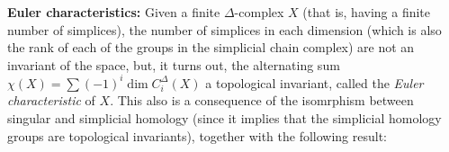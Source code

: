 \def\ccy{\Cyan}		  %
\def\cpb{\ProcessBlue}	  %
\def\csb{\SkyBlue}	  %
\def\ctu{\Turquoise}	  %
\def\ctb{\TealBlue}	  %
\def\caq{\Aquamarine}	  %
\def\cbg{\BlueGreen}	  %
\def\cem{\Emerald}	  %
\def\csg{\SeaGreen}	  %
\def\cgg{\Green}	  %
\def\cfg{\ForestGreen}	  %
\def\cpg{\PineGreen}	  %
\def\clg{\LimeGreen}	  %
\def\cyg{\YellowGreen}	  %
\def\cspg{\SpringGreen}	  %
\def\cog{\OliveGreen}	  %
\def\pars{\RawSienna}	  %
\def\cse{\Sepia}		  %
\def\cbr{\Brown}		  %
\def\cta{\Tan}		  %
\def\cgr{\Gray}		  %
\def\cbl{\Black}		  %
\def\cwh{\White}		  %


\loadmsbm



\def\ctln{\centerline}
\def\u{\underbar}
\def\ssk{\smallskip}
\def\msk{\medskip}
\def\bsk{\bigskip}
\def\hsk{\hskip.1in}
\def\hhsk{\hskip.2in}
\def\dsl{\displaystyle}
\def\hskp{\hskip1.5in}

\def\lra{$\Leftrightarrow$ }
\def\ra{\rightarrow}
\def\mpto{\logmapsto}
\def\pu{\pi_1}
\def\mpu{$\pi_1$}
\def\sig{\Sigma}
\def\msig{$\Sigma$}
\def\ep{\epsilon}
\def\sset{\subseteq}
\def\del{\partial}
\def\inv{^{-1}}
\def\wtl{\widetilde}
\def\del{\partial}
\def\delp{\partial^\prime}
\def\delpp{\partial^{\prime\prime}}
\def\sgn{{\roman{sgn}}}
\def\wtih{\widetilde{H}}
\def\bbz{{\Bbb Z}}
\def\bbr{{\Bbb R}}
\def\hdsk{\hskip.7in}
\def\hdskb{\hskip.9in}
\def\hdskc{\hskip1.1in}
\def\hdskd{\hskip1.3in}




{\bf Euler characteristics:} Given a finite $\Delta$-complex $X$ (that is, having a 
finite number of simplices), the number of simplices in each dimension (which is
also the rank of each of the groups in the simplicial chain complex) are not an invariant
of the space, but, it turns out, the alternating sum $\chi(X)=\sum (-1)^i \dim C_i^\Delta(X)$
\u{is} a topological invariant, called the {\it Euler characteristic} of $X$. This also
is a consequence of the isomrphism between singular and simplicial homology (since it
implies that the simplicial homology groups are topological invariants), together with
the following result:

